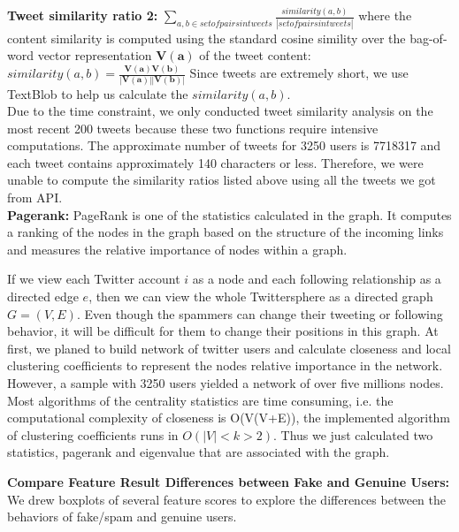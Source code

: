 \documentclass[a4paper, 12pt]{report}
\begin{document}
\noindent\textbf{Tweet similarity ratio 2:} $\sum_{a,b \in set of pairs in tweets}\frac{similarity(a,b)}{|set of pairs in tweets|}$ where the content similarity is computed using the standard cosine simility over the bag-of-word vector representation $\mathbf{V(a)}$ of the tweet content: $similarity(a,b)=\frac{\mathbf{V(a)}\mathbf{V(b)}}{|\mathbf{V(a)}||\mathbf{V(b)}|}$ Since tweets are extremely short, we use TextBlob to help us calculate the $similarity(a,b)$. \\

\noindent Due to the time constraint, we only conducted tweet similarity analysis on the most recent 200 tweets because these two functions require intensive computations. The approximate number of tweets for 3250 users is 7718317 and each tweet contains approximately 140 characters or less. Therefore, we were unable to compute the similarity ratios listed above using all the tweets we got from API.\\ 

\noindent\textbf{Pagerank:} PageRank is one of the statistics calculated in the graph. It computes a ranking of the nodes in the graph based on the structure of the incoming links and measures the relative importance of nodes within a graph. \par 

\noindent If we view each Twitter account $i$ as a node and each following relationship as a directed edge $e$, then we can view the whole Twittersphere as a directed graph $G = (V, E)$. Even though the spammers can change their tweeting or following behavior, it will be difficult for them to change their positions in this graph. At first, we planed to build network of twitter users and calculate closeness and local clustering coefficients to represent the nodes relative importance in the network. However, a sample with 3250 users yielded a network of over five millions nodes. Most algorithms of the centrality statistics are time consuming, i.e. the computational complexity of closeness is O(V(V+E)), the implemented algorithm of clustering coefficients runs in $O(|V|<k>2)$. Thus we just calculated two statistics, pagerank and eigenvalue that are associated with the graph. \\ \par

\noindent\textbf{Compare Feature Result Differences between Fake and Genuine Users:} We drew boxplots of several feature scores to explore the differences between the behaviors of fake/spam and genuine users. 
\end{document}
